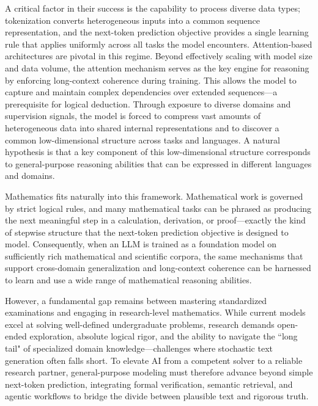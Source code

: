 \documentclass[11pt]{article}
\numberwithin{equation}{section}
\begin{document}
A critical factor in their success is the capability to process diverse data types; tokenization converts heterogeneous inputs into a common sequence representation, and the next-token prediction objective provides a single learning rule that applies uniformly across all tasks the model encounters. Attention-based architectures are pivotal in this regime. Beyond effectively scaling with model size and data volume, the attention mechanism serves as the key engine for reasoning by enforcing long-context coherence during training. This allows the model to capture and maintain complex dependencies over extended sequences—a prerequisite for logical deduction. Through exposure to diverse domains and supervision signals, the model is forced to compress vast amounts of heterogeneous data into shared internal representations and to discover a common low-dimensional structure across tasks and languages. A natural hypothesis is that a key component of this low-dimensional structure corresponds to general-purpose reasoning abilities that can be expressed in different languages and domains.

Mathematics fits naturally into this framework. Mathematical work is governed by strict logical rules, and many mathematical tasks can be phrased as producing the next meaningful step in a calculation, derivation, or proof—exactly the kind of stepwise structure that the next-token prediction objective is designed to model. Consequently, when an LLM is trained as a foundation model on sufficiently rich mathematical and scientific corpora, the same mechanisms that support cross-domain generalization and long-context coherence can be harnessed to learn and use a wide range of mathematical reasoning abilities.

However, a fundamental gap remains between mastering standardized examinations and engaging in research-level mathematics. While current models excel at solving well-defined undergraduate problems, research demands open-ended exploration, absolute logical rigor, and the ability to navigate the ``long tail" of specialized domain knowledge—challenges where stochastic text generation often falls short. To elevate AI from a competent solver to a reliable research partner, general-purpose modeling must therefore advance beyond simple next-token prediction, integrating formal verification, semantic retrieval, and agentic workflows to bridge the divide between plausible text and rigorous truth.
\end{document}

